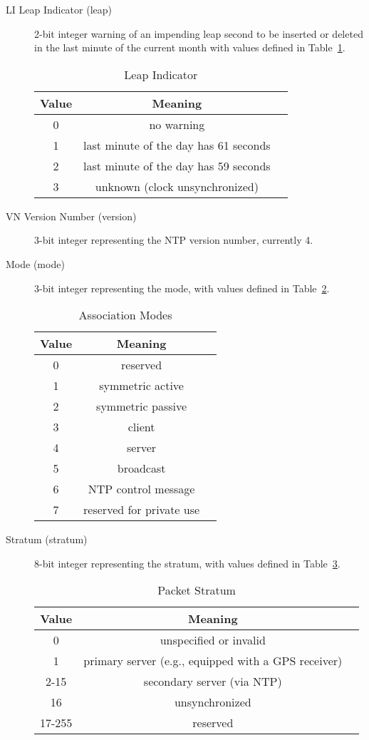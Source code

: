 \begin{description}

\item[LI Leap Indicator (leap)] 2-bit integer warning of an impending leap
second to be inserted or deleted in the last minute of the current
month with values defined in Table~\ref{leap_indicator}.

\begin{table}[htb]
\center
\begin{tabular}{c | c | c}
Value & Meaning \\
\hline
\hline
0 & no warning \\
1 & last minute of the day has 61 seconds \\
2 & last minute of the day has 59 seconds \\
3 & unknown (clock unsynchronized) \\
\hline
\end{tabular}
\label{leap_indicator}
\caption{Leap Indicator}
\end{table}

\item[VN Version Number (version)] 3-bit integer representing the NTP
version number, currently 4.

\item[Mode (mode)] 3-bit integer representing the mode, with values defined
in Table~\ref{association_modes}.

\begin{table}[htb]
\center
\begin{tabular}{c | c | c}
Value & Meaning \\
\hline
\hline
0 & reserved \\
1 & symmetric active \\
2 & symmetric passive \\
3 & client \\
4 & server \\
5 & broadcast \\
6 & NTP control message \\
7 & reserved for private use \\
\hline
\end{tabular}
\label{association_modes}
\caption{Association Modes}
\end{table}

\item[Stratum (stratum)] 8-bit integer representing the stratum, with
values defined in Table~\ref{packet_stratum}.

\begin{table}[htb]
\center
\begin{tabular}{c | c | c}
Value & Meaning \\
\hline
\hline
0 & unspecified or invalid \\
1 & primary server (e.g., equipped with a GPS receiver) \\
2-15 & secondary server (via NTP) \\
16 & unsynchronized \\
17-255 & reserved \\
\hline
\end{tabular}
\label{packet_stratum}
\caption{Packet Stratum}
\end{table}


\end{description}
